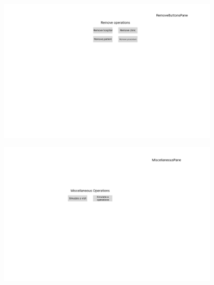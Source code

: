 \documentclass{article}
\begin{document}
\begin{figure}
  \begin{center}
    \includegraphics[width=0.95\textwidth]{./figures/Interface_designs/RemoveButtonsPanel.png}
  \end{center}
\end{figure}

\begin{figure}
  \begin{center}
    \includegraphics[width=0.95\textwidth]{./figures/Interface_designs/MiscellaneousPanel.png}
  \end{center}
\end{figure}

\newpage
\end{document}

